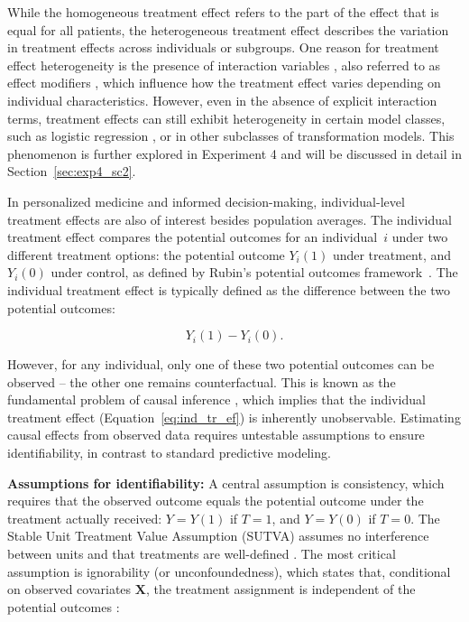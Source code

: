 While the homogeneous treatment effect refers to the part of the effect that is equal for all patients, the heterogeneous treatment effect describes the variation in treatment effects across individuals or subgroups. One reason for treatment effect heterogeneity is the presence of interaction variables \citep{hoogland2021}, also referred to as effect modifiers \citep{christensen2021}, which influence how the treatment effect varies depending on individual characteristics. However, even in the absence of explicit interaction terms, treatment effects can still exhibit heterogeneity in certain model classes, such as logistic regression \citep{hoogland2021}, or in other subclasses of transformation models. This phenomenon is further explored in Experiment 4 and will be discussed in detail in Section~\ref{sec:exp4_sc2}.

In personalized medicine and informed decision-making, individual-level treatment effects are also of interest besides population averages. The individual treatment effect compares the potential outcomes for an individual~$i$ under two different treatment options: the potential outcome $Y_i(1)$ under treatment, and $Y_i(0)$ under control, as defined by Rubin's potential outcomes framework~\citep{rubin2005}. The individual treatment effect is typically defined as the difference between the two potential outcomes:


\begin{equation}
Y_i(1) - Y_i(0).
\label{eq:ind_tr_ef}
\end{equation}



However, for any individual, only one of these two potential outcomes can be observed -- the other one remains counterfactual. This is known as the fundamental problem of causal inference \citep{holland1986}, which implies that the individual treatment effect (Equation~\ref{eq:ind_tr_ef}) is inherently unobservable. Estimating causal effects from observed data requires untestable assumptions to ensure identifiability, in contrast to standard predictive modeling.


\medskip 

\textbf{Assumptions for identifiability:} A central assumption is consistency, which requires that the observed outcome equals the potential outcome under the treatment actually received: $Y = Y(1)$ if $T = 1$, and $Y = Y(0)$ if $T = 0$. The Stable Unit Treatment Value Assumption (SUTVA) assumes no interference between units and that treatments are well-defined \citep{rubin1980}. The most critical assumption is ignorability (or unconfoundedness), which states that, conditional on observed covariates $\mathbf{X}$, the treatment assignment is independent of the potential outcomes \citep{rosenbaum1983}:

